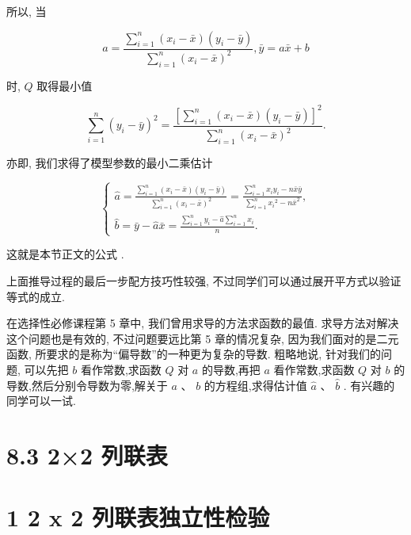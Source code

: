 \documentclass[10pt]{article}
\newcommand*\circled[1]{\tikz[baseline=(char.base)]{\node[shape=circle,draw,inner sep=1.5pt] (char) {\small #1};}}
\begin{document}
所以, 当

\[
a = \frac{\mathop{\sum }\limits_{{i = 1}}^{n}\left( {{x}_{i} - \bar{x}}\right) \left( {{y}_{i} - \bar{y}}\right) }{\mathop{\sum }\limits_{{i = 1}}^{n}{\left( {x}_{i} - \bar{x}\right) }^{2}},\bar{y} = a\bar{x} + b
\]

时, \(Q\) 取得最小值

\[
\mathop{\sum }\limits_{{i = 1}}^{n}{\left( {y}_{i} - \bar{y}\right) }^{2} = \frac{{\left\lbrack  \mathop{\sum }\limits_{{i = 1}}^{n}\left( {x}_{i} - \bar{x}\right) \left( {y}_{i} - \bar{y}\right) \right\rbrack  }^{2}}{\mathop{\sum }\limits_{{i = 1}}^{n}{\left( {x}_{i} - \bar{x}\right) }^{2}}.
\]

亦即, 我们求得了模型参数的最小二乘估计

\[
\left\{  \begin{array}{l} \widehat{a} = \frac{\mathop{\sum }\limits_{{i = 1}}^{n}\left( {{x}_{i} - \bar{x}}\right) \left( {{y}_{i} - \bar{y}}\right) }{\mathop{\sum }\limits_{{i = 1}}^{n}{\left( {x}_{i} - \bar{x}\right) }^{2}} = \frac{\mathop{\sum }\limits_{{i = 1}}^{n}{x}_{i}{y}_{i} - n\bar{x}\bar{y}}{\mathop{\sum }\limits_{{i = 1}}^{n}{x}_{i}{}^{2} - n{\bar{x}}^{2}}, \\  \widehat{b} = \bar{y} - \widehat{a}\bar{x} = \frac{\mathop{\sum }\limits_{{i = 1}}^{n}{y}_{i} - \widehat{a}\mathop{\sum }\limits_{{i = 1}}^{n}{x}_{i}}{n}. \end{array}\right.
\]

这就是本节正文的公式 \circled{3} .

上面推导过程的最后一步配方技巧性较强, 不过同学们可以通过展开平方式以验证等式的成立.

在选择性必修课程第 5 章中, 我们曾用求导的方法求函数的最值. 求导方法对解决这个问题也是有效的, 不过问题要远比第 5 章的情况复杂, 因为我们面对的是二元函数, 所要求的是称为“偏导数”的一种更为复杂的导数. 粗略地说, 针对我们的问题, 可以先把 \(b\) 看作常数,求函数 \(Q\) 对 \(a\) 的导数,再把 \(a\) 看作常数,求函数 \(Q\) 对 \(b\) 的导数,然后分别令导数为零,解关于 \(a\text{ 、 }b\) 的方程组,求得估计值 \(\widehat{a}\text{ 、 }\widehat{b}\) . 有兴趣的同学可以一试.

\section*{8.3 2×2 列联表}

\section*{1 2 x 2 列联表独立性检验}
\end{document}

